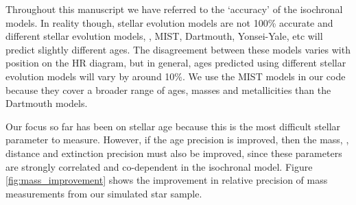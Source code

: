 Throughout this manuscript we have referred to the `accuracy' of the
isochronal models.
In reality though, stellar evolution models are not 100\% accurate and
different stellar evolution models, \eg, MIST, Dartmouth, Yonsei-Yale, etc
will predict slightly different ages.
The disagreement between these models varies with position on the HR diagram,
but in general, ages predicted using different stellar evolution models will
vary by around 10\%.
We use the MIST models in our code because they cover a broader range of ages,
masses and metallicities than the Dartmouth models.

Our focus so far has been on stellar age because this is the most difficult
stellar parameter to measure.
However, if the age precision is improved, then the mass, \feh, distance and
extinction precision must also be improved, since these parameters are
strongly correlated and co-dependent in the isochronal model.
Figure \ref{fig:mass_improvement} shows the improvement in relative precision
of mass measurements from our simulated star sample.

